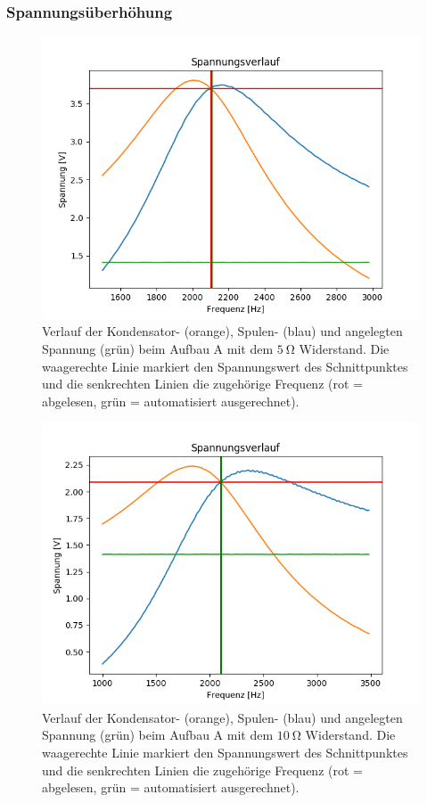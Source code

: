 \documentclass[12pt,a4paper]{article}
\begin{document}
\subsubsection{Spannungsüberhöhung}
\begin{figure}
	\centering
	\includegraphics[scale=0.8]{Bilder/Serie_Spannungsueberhoehung_A_5.png}
	\caption{Verlauf der Kondensator- (orange), Spulen- (blau) und angelegten Spannung (grün) beim Aufbau A mit dem $\SI{5}{\ohm}$ Widerstand. Die waagerechte Linie markiert den Spannungswert des Schnittpunktes und die senkrechten Linien die zugehörige Frequenz (rot = abgelesen, grün = automatisiert ausgerechnet).}
	\label{fig:Serie_Spannungsueberhoehung_A_5}
\end{figure}
\begin{figure}
	\centering
	\includegraphics[scale=0.8]{Bilder/Serie_Spannungsueberhoehung_A_10.png}
	\caption{Verlauf der Kondensator- (orange), Spulen- (blau) und angelegten Spannung (grün) beim Aufbau A mit dem $\SI{10}{\ohm}$ Widerstand. Die waagerechte Linie markiert den Spannungswert des Schnittpunktes und die senkrechten Linien die zugehörige Frequenz (rot = abgelesen, grün = automatisiert ausgerechnet).}
	\label{fig:Serie_Spannungsueberhoehung_A_10}
\end{figure}
\end{document}
